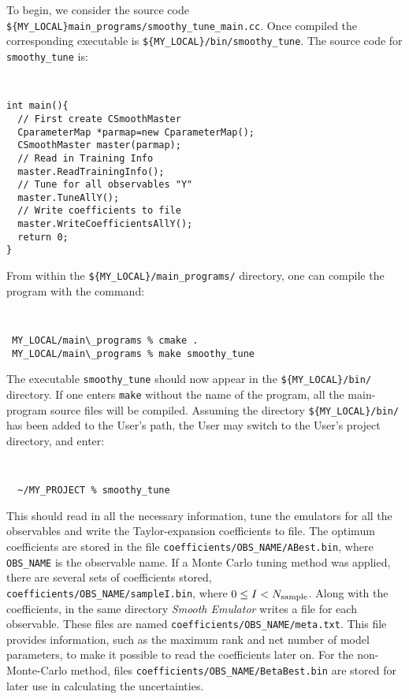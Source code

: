 \documentclass[UserManual.tex]{subfiles}
\begin{document}
To begin, we consider the source code {\tt \$\{MY\_LOCAL\}main\_programs/smoothy\_tune\_main.cc}. Once compiled the corresponding executable is {\tt \$\{MY\_LOCAL\}/bin/smoothy\_tune}. The source code for {\tt smoothy\_tune} is:
{\tt
\begin{verbatim}
int main(){
  // First create CSmoothMaster
  CparameterMap *parmap=new CparameterMap();
  CSmoothMaster master(parmap); 
  // Read in Training Info
  master.ReadTrainingInfo(); 
  // Tune for all observables "Y"
  master.TuneAllY();
  // Write coefficients to file
  master.WriteCoefficientsAllY();
  return 0;
}
\end{verbatim}
}
From within the {\tt \$\{MY\_LOCAL\}/main\_programs/} directory, one can compile the program with the command:
{\tt
\begin{verbatim}
 MY_LOCAL/main\_programs % cmake .
 MY_LOCAL/main\_programs % make smoothy_tune
\end{verbatim}
}
The executable {\tt smoothy\_tune} should now appear in the {\tt \$\{MY\_LOCAL\}/bin/} directory. If one enters {\tt make} without the name of the program, all the main-program source files will be compiled. Assuming the directory {\tt \$\{MY\_LOCAL\}/bin/} has been added to the User's path, the User may switch to the User's project directory, and enter:
{\tt
\begin{verbatim}
  ~/MY_PROJECT % smoothy_tune
\end{verbatim}
}
This should read in all the necessary information, tune the emulators for all the observables and write the Taylor-expansion coefficients to file.  The optimum coefficients are stored in the file {\tt coefficients/OBS\_NAME/ABest.bin}, where {\tt OBS\_NAME} is the observable name. If a Monte Carlo tuning method was applied, there are several sets of coefficients stored,\\{\tt coefficients/OBS\_NAME/sampleI.bin}, where $0\le I<N_{\rm sample}$. Along with the coefficients, in the same directory {\it Smooth Emulator} writes a file for each observable. These files are named {\tt coefficients/OBS\_NAME/meta.txt}.  This file provides information, such as the maximum rank and net number of model parameters, to make it possible to read the coefficients later on. For the non-Monte-Carlo method,  files {\tt coefficients/OBS\_NAME/BetaBest.bin} are stored for later use in calculating the uncertainties.
\end{document}
